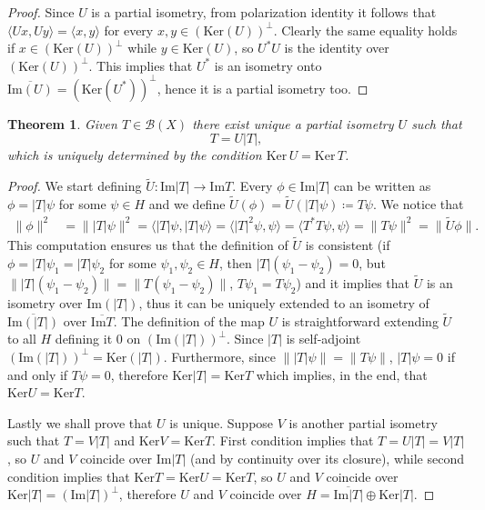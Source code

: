 \documentclass[corpo=11pt, stile=classica, tipotesi=custom,
greek, evenboxes, english]{toptesi}
\numberwithin{equation}{chapter}
\newtheorem{teo}{Theorem}[chapter] %
\theoremstyle{remark}
\newcommand{\B}{\mathscr{B}} %
\begin{document}
\begin{proof}
	{\color{red} Since $U$ is a partial isometry, from polarization identity it follows that $\langle Ux,Uy \rangle = \langle x,y \rangle$ for every $x,y \in (\mathrm{Ker}(U))^{\perp}$. Clearly the same equality holds if $x \in (\mathrm{Ker}(U))^{\perp}$ while $y \in \mathrm{Ker}(U)$, so $U^*U$ is the identity over $(\mathrm{Ker}(U))^{\perp}$. This implies that $U^*$ is an isometry onto $\overline{\mathrm{Im}(U)} = (\mathrm{Ker}(U^*))^{\perp}$, hence it is a partial isometry too.}
\end{proof}
\begin{teo}\label{polar decomposition theorem}
	Given $T \in \B(X)$ there exist unique a partial isometry $U$ such that
	\begin{equation}\label{polar decomposition formula}
		T = U|T|,
	\end{equation}
	which is uniquely determined by the condition $\mathrm{Ker}\,U = \mathrm{Ker}\,T$.
\end{teo}
\begin{proof}
	We start defining $\tilde{U} : \mathrm{Im}|T| \rightarrow \mathrm{Im}T$. Every $\phi \in \mathrm{Im}|T|$ can be written as $\phi = |T|\psi$ for some $\psi \in H$ and we define $\tilde{U}(\phi) = \tilde{U}(|T|\psi) \coloneqq T\psi$. We notice that	
	\begin{align*}
		\|\phi\|^2 &= \||T|\psi\|^2 = \langle |T|\psi, |T|\psi \rangle  = \langle |T|^2 \psi, \psi \rangle = \langle T^*T \psi, \psi \rangle = \|T \psi \|^2 = \|\tilde{U}\phi\|.
	\end{align*}
	This computation ensures us that the definition of $\tilde{U}$ is consistent (if $\phi = |T|\psi_1 = |T|\psi_2$ for some $\psi_1,\psi_2 \in H$, then $|T|(\psi_1 - \psi_2)=0$, but $\| |T|(\psi_1 - \psi_2)\| = \| T(\psi_1 - \psi_2)\|$, $T\psi_1 = T\psi_2$) and it implies that $\tilde{U}$ is an isometry over $\mathrm{Im}(|T|)$, thus it can be uniquely extended to an isometry of $\overline{\mathrm{Im}(|T|)}$ over $\overline{\mathrm{Im}T}$. The definition of the map $U$ is straightforward extending $\tilde{U}$ to all $H$ defining it 0 on $(\mathrm{Im}(|T|))^{\perp}$. Since $|T|$ is self-adjoint $(\mathrm{Im}(|T|))^{\perp} = \mathrm{Ker}(|T|)$. Furthermore, since $\| |T|\psi\| = \| T\psi\|$, $|T|\psi=0$ if and only if $T\psi=0$, therefore $\mathrm{Ker}|T| = \mathrm{Ker}T$ which implies, in the end, that $\mathrm{Ker}U = \mathrm{Ker}T$.
	
	Lastly we shall prove that $U$ is unique. Suppose $V$ is another partial isometry such that $T = V|T|$ and $\mathrm{Ker}V = \mathrm{Ker}T$. First condition implies that $T = U|T| = V|T|$, so $U$ and $V$ coincide over $\mathrm{Im}|T|$ (and by continuity over its closure), while second condition implies that $\mathrm{Ker}T = \mathrm{Ker}U = \mathrm{Ker}T$, so $U$ and $V$ coincide over $\mathrm{Ker}|T| = (\mathrm{Im}|T|)^{\perp}$, therefore $U$ and $V$ coincide over $H = \overline{\mathrm{Im}|T|} \oplus \mathrm{Ker}|T|$.
\end{proof}
\end{document}
